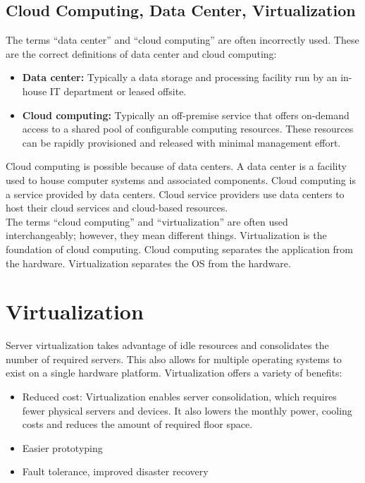 \subsection{Cloud Computing, Data Center, Virtualization}

The terms ``data center'' and ``cloud computing'' are often incorrectly used. These are the correct definitions of data center and cloud computing:

\begin{itemize}
\item \textbf{Data center:} Typically a data storage and processing facility run by an in-house IT department or leased offsite.
\item \textbf{Cloud computing:} Typically an off-premise service that offers on-demand access to a shared pool of configurable computing resources. These resources can be rapidly provisioned and released with minimal management effort.
\end{itemize}

Cloud computing is possible because of data centers. A data center is a facility used to house computer systems and associated components. Cloud computing is a service provided by data centers. Cloud service providers use data centers to host their cloud services and cloud-based resources.\\

The terms ``cloud computing'' and ``virtualization'' are often used interchangeably; however, they mean different things. Virtualization is the foundation of cloud computing. Cloud computing separates the application from the hardware. Virtualization separates the OS from the hardware. 

\section{Virtualization}

Server virtualization takes advantage of idle resources and consolidates the number of required servers. This also allows for multiple operating systems to exist on a single hardware platform. Virtualization offers a variety of benefits:

\begin{itemize}
\item Reduced cost: Virtualization enables server consolidation, which requires fewer physical servers and devices. It also lowers the monthly power, cooling costs and reduces the amount of required floor space.

\item Easier prototyping

\item Fault tolerance, improved disaster recovery
\end{itemize}

